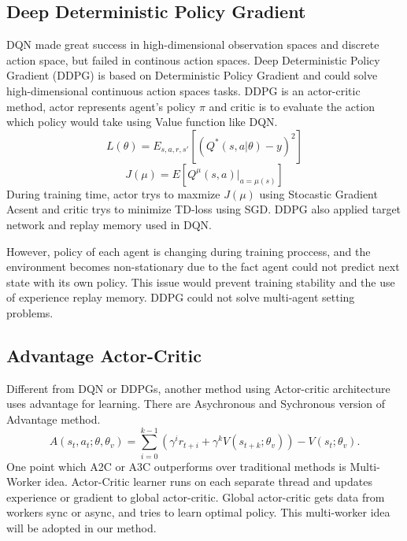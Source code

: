 \documentclass[11pt,twocolumn]{jarticle} %
\begin{document}
\subsection{Deep Deterministic Policy Gradient}
DQN made great success in high-dimensional observation spaces and discrete action space, but failed in continous action spaces. Deep Deterministic Policy Gradient (DDPG) \cite{6} is based on Deterministic Policy Gradient \cite{11} and could solve high-dimensional continuous action spaces tasks. DDPG is an actor-critic method, actor represents agent's policy $\pi$ and critic is to evaluate the action which policy would take using Value function like DQN. 
\begin{equation}
L(\theta) = E_{s,a,r,s'}[(Q^*(s, a|\theta) - y)^2] 
\end{equation}
\begin{equation}
J(\mu) = E[Q^\mu(s, a) | _{a=\mu(s)}]
\end{equation}
During training time, actor trys to maxmize $J(\mu)$ using Stocastic Gradient Acsent and critic trys to minimize TD-loss using SGD. DDPG also applied target network and replay memory used in DQN. \par
However, policy of each agent is changing during training proccess, and the environment becomes non-stationary due to the fact agent could not predict next state with its own policy. This issue would prevent training stability and the use of experience replay memory. DDPG could not solve multi-agent setting problems.

\subsection{Advantage Actor-Critic}
Different from DQN or DDPGs, another method using Actor-critic architecture uses advantage for learning. 
There are Asychronous \cite{12} and Sychronous \cite{13} version of Advantage method. 
\begin{equation}
A(s_t, a_t; \theta, \theta_v) = \sum_{i=0}^{k-1}(\gamma^i r_{t+i} + \gamma^k V(s_{t+k};\theta_v)) - V(s_t; \theta_v).
\end{equation}
One point which A2C or A3C outperforms over traditional methods is Multi-Worker idea. Actor-Critic learner runs on each separate thread and updates experience or gradient to global actor-critic. Global actor-critic gets data from workers sync or async, and tries to learn optimal policy. This multi-worker idea will be adopted in our method.
\end{document}
